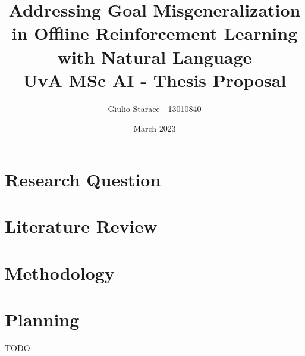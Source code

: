 \documentclass[12pt]{report}
\title{
Addressing Goal Misgeneralization in Offline Reinforcement Learning with Natural Language
\\
\Large UvA MSc AI - Thesis Proposal
}
\begin{document}
\author{Giulio Starace - 13010840}
\date{March 2023}
\maketitle

\chapter{Research Question} \label{chap:intro}


\chapter{Literature Review}


\chapter{Methodology}


\chapter{Planning}
TODO



\end{document}
